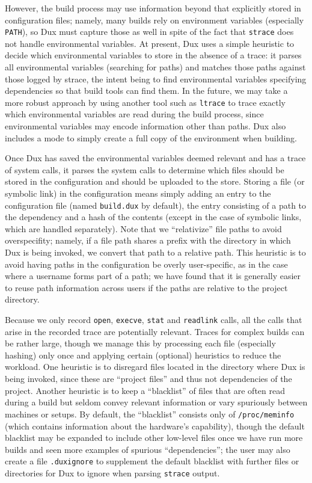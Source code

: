 \documentclass[10pt,conference]{IEEEtran}
\begin{document}
However, the build process may use information beyond that explicitly stored in configuration files; namely,
many builds rely on environment variables (especially \texttt{PATH}), so Dux must capture those as well
in spite of the fact that \texttt{strace} does not handle environmental variables. At present, Dux uses a
simple heuristic to decide which environmental variables to store in the absence of a trace: it parses
all environmental variables (searching for paths) and matches those paths against those logged by strace,
the intent being to find environmental variables specifying dependencies so that build tools can find them.
In the future, we may take a more robust approach by using another tool such as \texttt{ltrace} to trace
exactly which environmental variables are read during the build process, since environmental variables may
encode information other than paths. Dux also includes a mode to simply create a full copy of the environment
when building.

Once Dux has saved the environmental variables deemed relevant and has a trace of system calls, it parses
the system calls to determine which files should be stored in the configuration and should be uploaded to
the store. Storing a file (or symbolic link) in the configuration means simply adding an entry to the
configuration file (named \texttt{build.dux} by default), the entry consisting of a path to the dependency
and a hash of the contents
(except in the case of symbolic links, which are handled separately).
 Note that we ``relativize'' file paths to avoid overspecifity; namely,
if a file path shares a prefix with the directory in which Dux is being invoked, we convert that path to
a relative path. This heuristic is to avoid having paths in the configuration be overly user-specific, as in the
case where a username forms part of a path; we have found that it is generally easier to reuse path information
across users if the paths are relative to the project directory.

Because we only record \texttt{open}, \texttt{execve}, \texttt{stat} and \texttt{readlink} calls, all the
calls that arise in the recorded trace are potentially relevant. Traces for complex builds can be rather
large, though we manage this by processing each file (especially hashing) only once and applying certain
(optional) heuristics to reduce the workload. One heuristic is to disregard files located in the directory 
where Dux is being invoked, since these are ``project files'' and thus not dependencies of the project. 
Another heuristic is to keep a ``blacklist'' of files that are often read during a build but seldom convey 
relevant information or vary spuriously between machines or setups. By default, the ``blacklist'' consists 
only of \texttt{/proc/meminfo} (which contains information about the hardware's capability), though the 
default blacklist may be expanded to include other low-level files once we have run more builds and seen more
 examples of spurious ``dependencies''; the user may also create a file \texttt{.duxignore} to supplement 
the default blacklist with further files or directories for Dux to ignore when parsing \texttt{strace} output.
\end{document}

